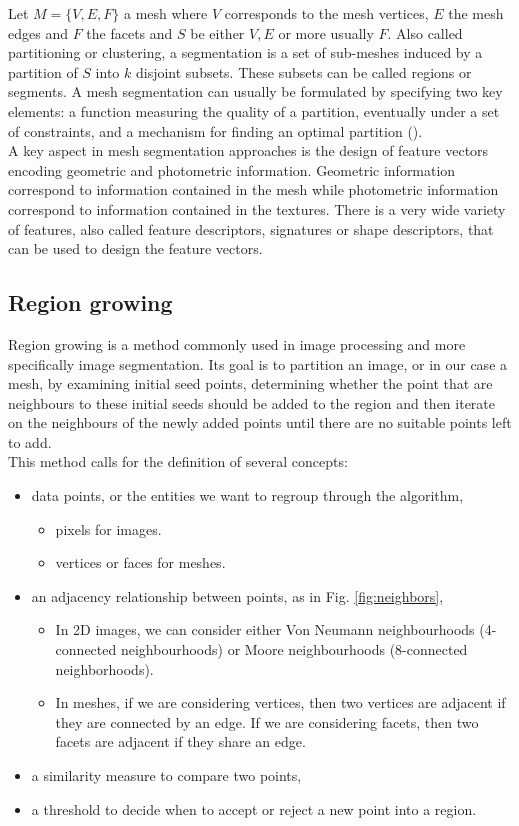 \documentclass{kththesis}
\begin{document}
Let $M=\{V, E, F\}$ a mesh where $V$ corresponds to the mesh vertices, $E$ the mesh edges and $F$ the facets and $S$ be either $V, E$ or more usually $F$. Also called partitioning or clustering, a segmentation is a set of sub-meshes induced by a partition of $S$ into $k$ disjoint subsets. These subsets can be called regions or segments.
A mesh segmentation can usually be formulated by specifying two key elements: a function measuring the quality of a partition, eventually under a set of constraints, and a mechanism for finding an optimal partition (\textcite{MeshSegCourse}).\\



\noindent A key aspect in mesh segmentation approaches is the design of feature vectors encoding geometric and photometric information. Geometric information correspond to information contained in the mesh while photometric information correspond to information contained in the textures. There is a very wide variety of features, also called feature descriptors, signatures or shape descriptors, that can be used to design the feature vectors. 

\subsection{Region growing} 
Region growing is a method commonly used in image processing and more specifically image segmentation. Its goal is to partition an image, or in our case a mesh, by examining initial seed points, determining whether the point that are neighbours to these initial seeds should be added to the region and then iterate on the neighbours of the newly added points until there are no suitable points left to add.  \\ 
This method calls for the definition of several concepts: 
\begin{itemize}
    \item data points, or the entities we want to regroup through the algorithm,
    \begin{itemize}
        \item pixels for images.
        \item vertices or faces for meshes.
    \end{itemize} 
    \item an adjacency relationship between points, as in Fig. \ref{fig:neighbors},
    \begin{itemize}
        \item In 2D images, we can consider either Von Neumann neighbourhoods (4-connected neighbourhoods) or Moore neighbourhoods (8-connected neighborhoods). 
        \item In meshes, if we are considering vertices, then two vertices are adjacent if they are connected by an edge. If we are considering facets, then two facets are adjacent if they share an edge. 
    \end{itemize}
    \item a similarity measure to compare two points,
    \item a threshold to decide when to accept or reject a new point into a region. 
\end{itemize}
\end{document}
